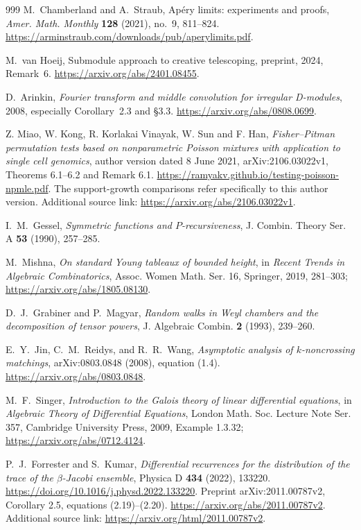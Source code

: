 \documentclass[11pt,a4paper]{article}
\theoremstyle{definition}
\theoremstyle{remark}
\numberwithin{equation}{section}
\begin{document}
\begin{thebibliography}{999}
M.~Chamberland and A.~Straub, Ap\'ery limits: experiments and proofs,
\emph{Amer. Math. Monthly} \textbf{128} (2021), no.~9, 811--824.
\url{https://arminstraub.com/downloads/pub/aperylimits.pdf}.

M.~van Hoeij, Submodule approach to creative telescoping,
preprint, 2024, Remark~6.
\url{https://arxiv.org/abs/2401.08455}.

D.~Arinkin, \emph{Fourier transform and middle convolution for irregular
D-modules}, 2008, especially Corollary~2.3 and \S3.3.
\url{https://arxiv.org/abs/0808.0699}.

Z. Miao, W. Kong, R. Korlakai Vinayak, W. Sun and F. Han,
\emph{Fisher--Pitman permutation tests based on nonparametric Poisson
mixtures with application to single cell genomics},
author version dated 8 June 2021, arXiv:2106.03022v1,
Theorems 6.1--6.2 and Remark 6.1.
\url{https://ramyakv.github.io/testing-poisson-npmle.pdf}.
The support-growth comparisons refer specifically to this author version.
Additional source link: \url{https://arxiv.org/abs/2106.03022v1}.

I.~M.~Gessel, \emph{Symmetric functions and $P$-recursiveness},
J. Combin. Theory Ser. A \textbf{53} (1990), 257--285.

M.~Mishna, \emph{On standard Young tableaux of bounded height},
in \emph{Recent Trends in Algebraic Combinatorics},
Assoc. Women Math. Ser. 16, Springer, 2019, 281--303;
\url{https://arxiv.org/abs/1805.08130}.

D.~J.~Grabiner and P.~Magyar,
\emph{Random walks in Weyl chambers and the decomposition of tensor powers},
J. Algebraic Combin. \textbf{2} (1993), 239--260.

E.~Y.~Jin, C.~M.~Reidys, and R.~R.~Wang,
\emph{Asymptotic analysis of $k$-noncrossing matchings},
arXiv:0803.0848 (2008), equation (1.4).
\url{https://arxiv.org/abs/0803.0848}.

M.~F.~Singer,
\emph{Introduction to the Galois theory of linear differential equations},
in \emph{Algebraic Theory of Differential Equations},
London Math. Soc. Lecture Note Ser. 357, Cambridge University Press,
2009, Example 1.3.32; \url{https://arxiv.org/abs/0712.4124}.

P.~J.~Forrester and S.~Kumar,
\emph{Differential recurrences for the distribution of the trace of the
$\beta$-Jacobi ensemble},
Physica D \textbf{434} (2022), 133220.
\url{https://doi.org/10.1016/j.physd.2022.133220}.
Preprint arXiv:2011.00787v2, Corollary 2.5,
equations (2.19)--(2.20).
\url{https://arxiv.org/abs/2011.00787v2}.
Additional source link: \url{https://arxiv.org/html/2011.00787v2}.


\end{thebibliography}
\end{document}
